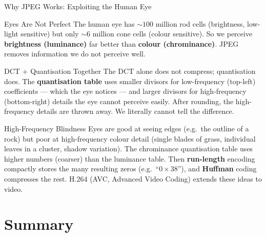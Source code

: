 \documentclass{beamer}
\begin{document}
\begin{frame}[shrink=10]{Why JPEG Works: Exploiting the Human Eye}
  \begin{block}{Eyes Are Not Perfect}
    The human eye has $\sim\!100$ million rod cells (brightness, low-light
    sensitive) but only $\sim\!6$ million cone cells (colour sensitive).
    So we perceive \textbf{brightness (luminance)} far better than
    \textbf{colour (chrominance)}. JPEG removes information we do not
    perceive well.
  \end{block}

  \begin{block}{DCT + Quantisation Together}
    The DCT alone does not compress; quantisation does. The
    \textbf{quantisation table} uses smaller divisors for low-frequency
    (top-left) coefficients --- which the eye notices --- and larger
    divisors for high-frequency (bottom-right) details the eye cannot
    perceive easily. After rounding, the high-frequency details are thrown
    away. We literally cannot tell the difference.
  \end{block}

  \begin{exampleblock}{High-Frequency Blindness}
    Eyes are good at seeing edges (e.g.\ the outline of a rock) but poor at
    high-frequency colour detail (single blades of grass, individual
    leaves in a cluster, shadow variation). The chrominance quantisation
    table uses higher numbers (coarser) than the luminance table. Then
    \textbf{run-length} encoding compactly stores the many resulting zeros
    (e.g.\ ``$0\times38$''), and \textbf{Huffman} coding compresses the
    rest. H.264 (AVC, Advanced Video Coding) extends these ideas to video.
  \end{exampleblock}
\end{frame}

\section{Summary}
\end{document}
